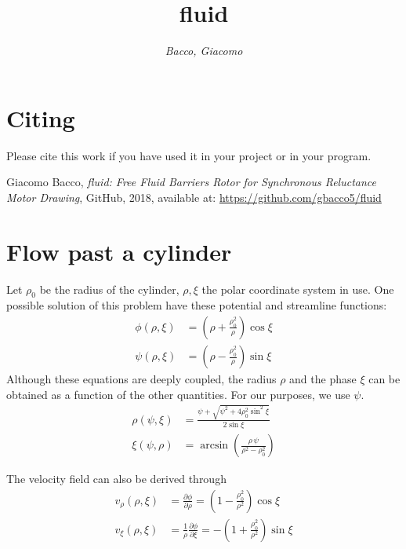 \documentclass[b5paper,11pt,oneside,fleqn]{article}
\title{\raggedleft\sffamily\Huge fluid}
\author{\sffamily\itshape Bacco, Giacomo}
\date{}
\newcommand{\de}{\partial}
\begin{document}
\maketitle


\section*{Citing}
Please cite this work if you have used it in your project or in your program.
\vspace{0\baselineskip}

{\small\noindent%
Giacomo Bacco, \emph{fluid: Free Fluid Barriers Rotor for Synchronous 
Reluctance Motor Drawing}, GitHub, 2018, available at: 
\url{https://github.com/gbacco5/fluid}
}

\section{Flow past a cylinder}

Let $ \rho_0 $ be the radius of the cylinder, $ \rho,\xi $ the polar coordinate 
system in use.
One possible solution of this problem have these potential and streamline 
functions:
\begin{align}
\phi(\rho,\xi) &= \left( \rho + \frac{\rho_0^2}{\rho} \right) \cos\xi \\[1ex]
\psi(\rho,\xi) &= \left( \rho - \frac{\rho_0^2}{\rho} \right) \sin\xi 
\end{align}
Although these equations are deeply coupled, the radius $ \rho $ and the phase 
$ \xi $ can be obtained as a function of the other quantities.
For our purposes, we use $ \psi $.
\begin{align}
\rho(\psi,\xi) &= \frac{\psi + \sqrt{\psi^2 + 4\rho_0^2 \sin^2\xi}}{2\sin\xi} 
\\[1ex]
\xi(\psi,\rho) &= \arcsin \left( \frac{\rho\, \psi}{\rho^2 - \rho_0^2} \right)  
\end{align}

The velocity field can also be derived through
\begin{equation}
\begin{aligned}
v_\rho(\rho,\xi)  &= \frac{\de\phi}{\de\rho} =
           \left( 1 - \frac{\rho_0^2}{\rho^2} \right) \cos\xi \\[1ex]
v_\xi(\rho,\xi)  &= \frac{1}{\rho} \frac{\de\phi}{\de\xi}  = 
          -\left( 1 + \frac{\rho_0^2}{\rho^2} \right) \sin\xi
\end{aligned}
\end{equation}
\end{document}
